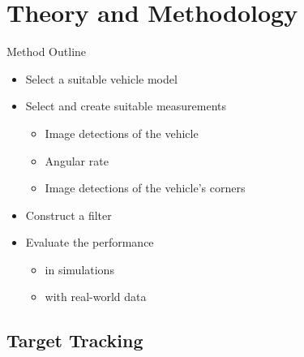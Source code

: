 \documentclass{beamer}
\begin{document}
\section{Theory and Methodology}

\begin{frame}{Method Outline}
	\begin{itemize}
		\item Select a suitable vehicle model
		\item Select and create suitable measurements
		\begin{itemize}
			\item Image detections of the vehicle
			\item Angular rate
			\item Image detections of the vehicle's corners
		\end{itemize}
		\item Construct a filter
		\item Evaluate the performance
		\begin{itemize}
			\item in simulations
			\item with real-world data
		\end{itemize}
	\end{itemize}
\end{frame}

\subsection{Target Tracking}
\end{document}
